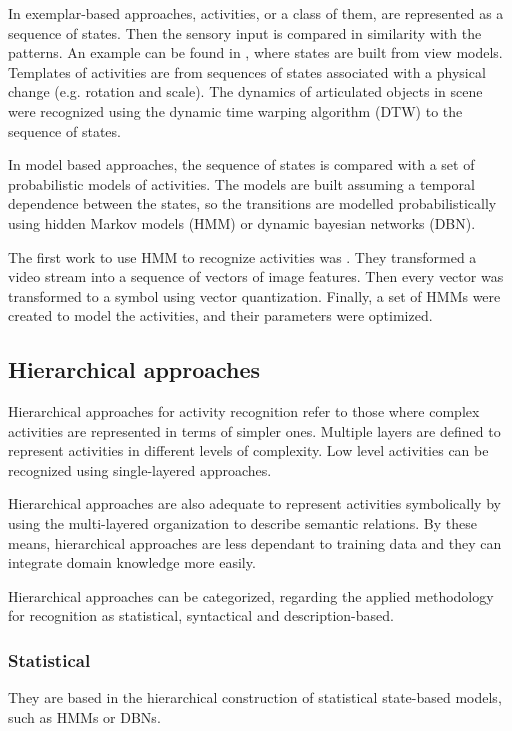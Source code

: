 In exemplar-based approaches, activities, or a class of them, are represented as a sequence of states. 
Then the sensory input is compared in similarity with the patterns.
An example can be found in \citep{Darrell1993_STGestures}, where states are built from view models.
Templates of activities are from sequences of states associated with a physical change (e.g. rotation and scale).
The dynamics of articulated objects in scene were recognized using the dynamic time warping algorithm (DTW) to the sequence of states.

In model based approaches, the sequence of states is compared with a set of probabilistic models of activities. The models are built assuming a temporal dependence between the states, so the transitions are modelled probabilistically using hidden Markov models (HMM) or dynamic bayesian networks (DBN).

The first work to use HMM to recognize activities was \citep{Yamato1992_RecHA_HMM}. They transformed a video stream into a sequence of vectors of image features. Then every vector was transformed to a symbol using vector quantization. Finally, a set of HMMs were created to model the activities, and their parameters were optimized. 



\subsection{Hierarchical approaches}
Hierarchical approaches for activity recognition refer to those where complex activities are represented in terms of simpler ones. 
Multiple layers are defined to represent activities in different levels of complexity.
Low level activities can be recognized using single-layered approaches. 

Hierarchical approaches are also adequate to represent activities symbolically by using the multi-layered organization to describe semantic relations.
By these means, hierarchical approaches are less dependant to training data and they can integrate domain knowledge more easily.

Hierarchical approaches can be categorized, regarding the applied methodology for recognition as statistical, syntactical and description-based. %


\subsubsection{Statistical}
They are based in the hierarchical construction of statistical state-based models, such as HMMs or DBNs.

